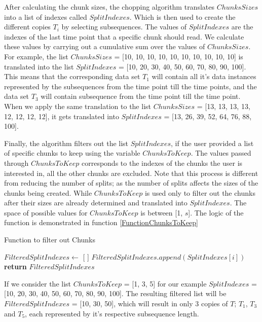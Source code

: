 After calculating the chunk sizes, the chopping algorithm translates $ChunksSizes$ into a list of indexes called $SplitIndexes$.
Which is then used to create the different copies $T_{i}$ by selecting subsequences.
The values of $SplitIndexes$ are the indexes of the last time point that a specific chunk should read.
We calculate these values by carrying out a cumulative sum over the values of $ChunksSizes$.
For example, the list $ChunksSizes$ = [10, 10, 10, 10, 10, 10, 10, 10, 10, 10] is translated into the list $SplitIndexes$ = [10, 20, 30, 40, 50, 60, 70, 80, 90, 100].
This means that the corresponding data set $T_{1}$ will contain all it's data instances represented by the subsequences from the  time point till the  time points,
and the data set $T_{3}$ will contain subsequence from the  time point till the  time point.
When we apply the same translation to the list $ChunksSizes$ = [13, 13, 13, 13, 12, 12, 12, 12], it gets translated into $SplitIndexes$ = [13, 26, 39, 52, 64, 76, 88, 100].

Finally, the algorithm filters out the list $SplitIndexes$, if the user provided a list of specific chunks to keep using the variable $ChunksToKeep$.
The values passed through $ChunksToKeep$ corresponds to the indexes of the chunks the user is interested in, all the other chunks are excluded.
Note that this process is different from reducing the number of splits; as the number of splits affects the sizes of the chunks being created.
While $ChunksToKeep$ is used only to filter out the chunks after their sizes are already determined and translated into $SplitIndexes$.
The space of possible values for $ChunksToKeep$ is between [1, $s$]. The logic of the function is demonstrated in function \ref{FunctionChunksToKeep}

\begin{algorithm}
    \caption{Function to filter out Chunks}\label{FunctionChunksToKeep}
    \begin{algorithmic}[1]
      \State $FilteredSplitIndexes \gets$ [ ]
                \State $FilteredSplitIndexes.append(SplitIndexes[i])$
        \EndFor
        \State \textbf{return} $FilteredSplitIndexes$
      \EndFunction
    \end{algorithmic}
\end{algorithm}

If we consider the list $ChunksToKeep$ = [1, 3, 5] for our example $SplitIndexes$ = [10, 20, 30, 40, 50, 60, 70, 80, 90, 100].
The resulting filtered list will be $FilteredSplitIndexes$ = [10, 30, 50], which will result in only 3 copies of $T$; $T_{1}$, $T_{3}$ and $T_{5}$,
each represented by it's respective subsequence length.

